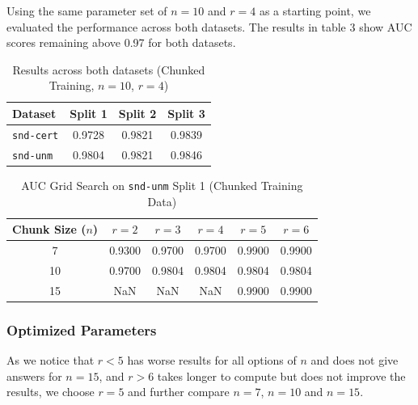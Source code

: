 \documentclass{article}
\begin{document}
Using the same parameter set of $n=10$ and $r=4$ as a starting point, we evaluated the performance across both datasets. The results in table 3 show AUC scores remaining above 0.97 for both datasets.
\begin{table}[h]
\centering
\caption{Results across both datasets (Chunked Training, $n=10$, $r=4$)}
\begin{tabular}{l c c c}
\hline
\textbf{Dataset} & \textbf{Split 1} & \textbf{Split 2} & \textbf{Split 3} \\
\hline
\texttt{snd-cert} & 0.9728 & 0.9821 & 0.9839 \\
\texttt{snd-unm}  & 0.9804 & 0.9821 & 0.9846 \\
\hline
\end{tabular}
\end{table}


\begin{table}[h]
\centering
\caption{AUC Grid Search on \texttt{snd-unm} Split 1 (Chunked Training Data)}
\begin{tabular}{c c c c c c}
\hline
\textbf{Chunk Size ($n$)} & \textbf{$r=2$} & \textbf{$r=3$} & \textbf{$r=4$} & \textbf{$r=5$} & \textbf{$r=6$} \\
\hline
7  & 0.9300 & 0.9700 & 0.9700 & 0.9900 & 0.9900 \\
10 & 0.9700 & 0.9804 & 0.9804 & 0.9804 & 0.9804 \\
15 & NaN    & NaN    & NaN    & 0.9900 & 0.9900 \\
\hline
\end{tabular}
\end{table}

\subsubsection{Optimized Parameters}
As we notice that $r<5$ has worse results for all options of $n$ and does not give answers for $n=15$, and $r>6$ takes longer to compute but does not improve the results, we choose $r=5$ and further compare $n=7$, $n=10$ and $n=15$.
\end{document}

